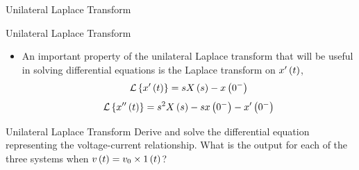 \documentclass[aspectratio=169]{beamer}
\def\lp{\ensuremath\left(}
\def\rp{\ensuremath\right)}
\def\lc{\ensuremath\left\{}
\def\rc{\ensuremath\right\}}
\begin{document}
\begin{frame}[t]{Unilateral Laplace Transform}
    
\end{frame}


\begin{frame}[t]{Unilateral Laplace Transform}
\begin{itemize}
    \item An important property of the unilateral Laplace transform that will be useful in solving differential equations is the Laplace transform on $x'\lp t\rp$,
    \[ \mathcal{L}\lc x'\lp t\rp\rc = sX\lp s\rp - x\lp 0^-\rp \]
    \[ \mathcal{L}\lc x''\lp t\rp\rc = s^2X\lp s\rp - sx\lp 0^-\rp - x'\lp 0^-\rp \]
\end{itemize}
\end{frame}


\begin{frame}[t]{Unilateral Laplace Transform}
Derive and solve the differential equation representing the voltage-current relationship. What is the output for each of the three systems when $v\lp t\rp = v_0 \times 1\lp t\rp$?
\begin{columns}
\begin{column}{0.275\textwidth}
\end{column}
\begin{column}{0.275\textwidth}
\end{column}
\begin{column}{0.275\textwidth}
\end{column}
\end{columns}
\end{frame}
\end{document}
